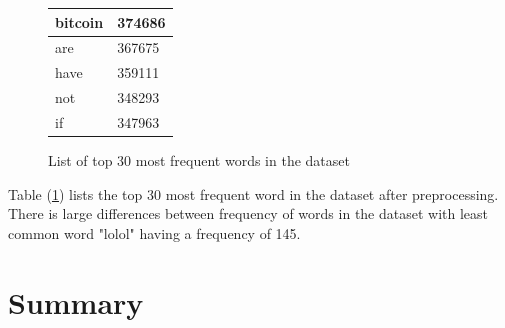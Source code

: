 \documentclass[transmag]{IEEEtran}
\begin{document}
\begin{figure}[h]
\begin{center}
\begin{tabular}{|l|l|}
bitcoin                             & 374686                                  \\ \hline
are                                 & 367675                                  \\ \hline
have                                & 359111                                  \\ \hline
not                                 & 348293                                  \\ \hline
if                                  & 347963                                  \\ \hline
\end{tabular}
\end{center}
\caption{List of top 30 most frequent words in the dataset}
    \label{tab:top30words}
\end{figure}

\noindent Table (\ref{tab:top30words}) lists the top 30 most frequent word in the dataset after preprocessing. There is large differences between frequency of words in the dataset with least common word "lolol" having a frequency of 145.




\section{Summary}












\end{document}
